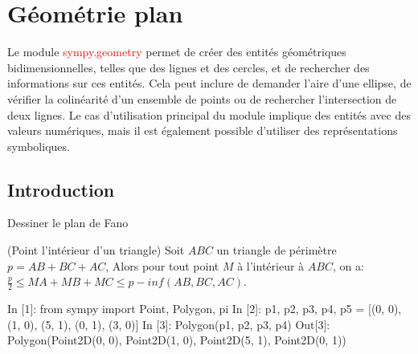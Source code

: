 \chapter{Géométrie plan}
Le module \textcolor{red}{sympy.geometry} permet de créer des entités géométriques bidimensionnelles, telles que des lignes et des cercles, et de rechercher des informations sur ces entités. Cela peut inclure de demander l’aire d’une ellipse, de vérifier la colinéarité d’un ensemble de points ou de rechercher l’intersection de deux lignes. Le cas d'utilisation principal du module implique des entités avec des valeurs numériques, mais il est également possible d'utiliser des représentations symboliques.

\section{Introduction}

\begin{example}
Dessiner le plan de Fano
\end{example}

\begin{exercise}(Point l'intérieur d'un triangle)
Soit $ABC$ un triangle de périmètre $p=AB+BC+AC$, Alors pour tout point $M$ à l'intérieur à $ABC$, on a: $\frac{p}{2} \leq MA+MB+MC \leq p-inf\left(AB, BC, AC\right)$.
\end{exercise}


\begin{python}
In [1]: from sympy import Point, Polygon, pi
In [2]: p1, p2, p3, p4, p5 = [(0, 0), (1, 0), (5, 1), (0, 1), (3, 0)]
In [3]: Polygon(p1, p2, p3, p4)
Out[3]: Polygon(Point2D(0, 0), Point2D(1, 0), Point2D(5, 1), Point2D(0, 1))
\end{python}

